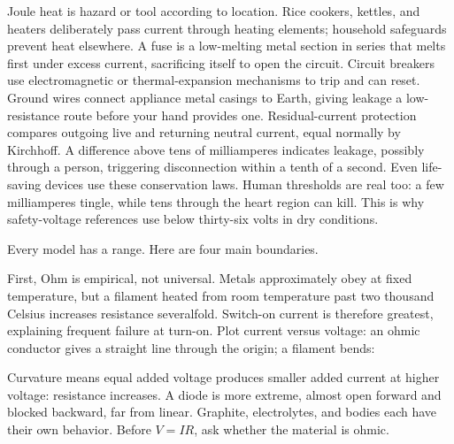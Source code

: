 Joule heat is hazard or tool according to location. Rice cookers, kettles, and heaters deliberately pass current through heating elements; household safeguards prevent heat elsewhere. A fuse is a low-melting metal section in series that melts first under excess current, sacrificing itself to open the circuit. Circuit breakers use electromagnetic or thermal-expansion mechanisms to trip and can reset. Ground wires connect appliance metal casings to Earth, giving leakage a low-resistance route before your hand provides one. Residual-current protection compares outgoing live and returning neutral current, equal normally by Kirchhoff. A difference above tens of milliamperes indicates leakage, possibly through a person, triggering disconnection within a tenth of a second. Even life-saving devices use these conservation laws. Human thresholds are real too: a few milliamperes tingle, while tens through the heart region can kill. This is why safety-voltage references use below thirty-six volts in dry conditions.


Every model has a range. Here are four main boundaries.

First, Ohm is empirical, not universal. Metals approximately obey at fixed temperature, but a filament heated from room temperature past two thousand Celsius increases resistance severalfold. Switch-on current is therefore greatest, explaining frequent failure at turn-on. Plot current versus voltage: an ohmic conductor gives a straight line through the origin; a filament bends:

\begin{center}
\end{center}

Curvature means equal added voltage produces smaller added current at higher voltage: resistance increases. A diode is more extreme, almost open forward and blocked backward, far from linear. Graphite, electrolytes, and bodies each have their own behavior. Before \(V=IR\), ask whether the material is ohmic.

